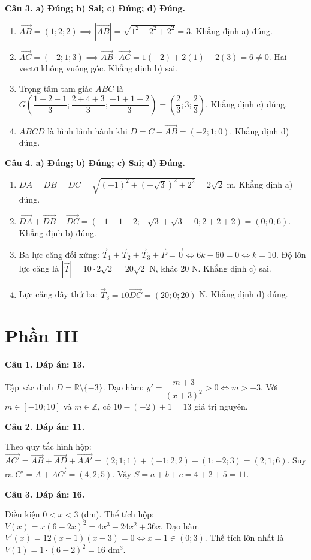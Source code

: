 \documentclass[12pt,a4paper]{article}
\newcommand{\loigiai}[1]{\par\medskip\Needspace{4\baselineskip}\noindent\textbf{#1}\par\nobreak}
\begin{document}
\loigiai{Câu 3. a) Đúng; b) Sai; c) Đúng; d) Đúng.}
\begin{enumerate}[label=\alph*),leftmargin=*,itemsep=2pt]
\item $\overrightarrow{AB}=(1;2;2)\implies |\overrightarrow{AB}|=\sqrt{1^2+2^2+2^2}=3$. Khẳng định a) đúng.
\item $\overrightarrow{AC}=(-2;1;3)\implies \overrightarrow{AB}\cdot\overrightarrow{AC}=1(-2)+2(1)+2(3)=6\ne0$. Hai vectơ không vuông góc. Khẳng định b) sai.
\item Trọng tâm tam giác $ABC$ là $G\left(\dfrac{1+2-1}3;\dfrac{2+4+3}3;\dfrac{-1+1+2}3\right)=\left(\dfrac23;3;\dfrac23\right)$. Khẳng định c) đúng.
\item $ABCD$ là hình bình hành khi $D=C-\overrightarrow{AB}=(-2;1;0)$. Khẳng định d) đúng.
\end{enumerate}

\loigiai{Câu 4. a) Đúng; b) Đúng; c) Sai; d) Đúng.}
\begin{enumerate}[label=\alph*),leftmargin=*,itemsep=2pt]
\item $DA=DB=DC=\sqrt{(-1)^2+(\pm\sqrt3)^2+2^2}=2\sqrt2$ m. Khẳng định a) đúng.
\item $\overrightarrow{DA}+\overrightarrow{DB}+\overrightarrow{DC}=(-1-1+2;-\sqrt3+\sqrt3+0;2+2+2)=(0;0;6)$. Khẳng định b) đúng.
\item Ba lực căng đối xứng: $\vec T_1+\vec T_2+\vec T_3+\vec P=\vec0\Leftrightarrow 6k-60=0\Leftrightarrow k=10$. Độ lớn lực căng là $|\vec T|=10\cdot2\sqrt2=20\sqrt2$ N, khác $20$ N. Khẳng định c) sai.
\item Lực căng dây thứ ba: $\vec T_3=10\overrightarrow{DC}=(20;0;20)$ N. Khẳng định d) đúng.
\end{enumerate}

\newpage
\section*{\large Phần III}
\loigiai{Câu 1. Đáp án: 13.}
Tập xác định $D=\mathbb R\setminus\{-3\}$. Đạo hàm:
$y'=\dfrac{m+3}{(x+3)^2}>0\Leftrightarrow m>-3$.
Với $m\in[-10;10]$ và $m\in\mathbb Z$, có $10-(-2)+1=13$ giá trị nguyên.

\loigiai{Câu 2. Đáp án: 11.}
Theo quy tắc hình hộp:
$\overrightarrow{AC'}=\overrightarrow{AB}+\overrightarrow{AD}+\overrightarrow{AA'}=(2;1;1)+(-1;2;2)+(1;-2;3)=(2;1;6)$.
Suy ra $C'=A+\overrightarrow{AC'}=(4;2;5)$. Vậy $S=a+b+c=4+2+5=11$.

\loigiai{Câu 3. Đáp án: 16.}
Điều kiện $0<x<3$ (dm). Thể tích hộp: $V(x)=x(6-2x)^2=4x^3-24x^2+36x$.
Đạo hàm $V'(x)=12(x-1)(x-3)=0\Leftrightarrow x=1\in(0;3)$.
Thể tích lớn nhất là $V(1)=1\cdot(6-2)^2=16$ dm$^3$.
\end{document}
